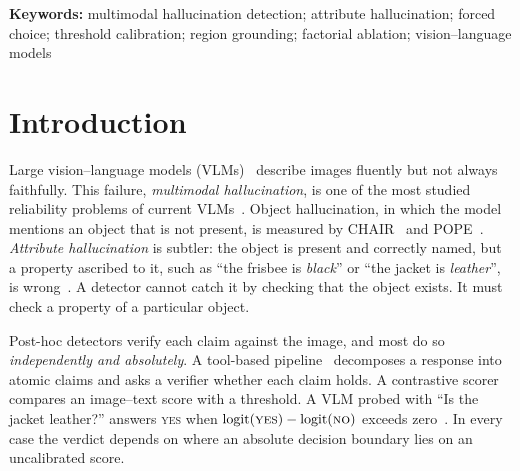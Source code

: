 \documentclass[11pt]{article}
\newcommand{\yes}{\textsc{yes}}
\newcommand{\no}{\textsc{no}}
\begin{document}
\noindent\textbf{Keywords:} multimodal hallucination detection; attribute hallucination; forced choice; threshold calibration; region grounding; factorial ablation; vision--language models

\section{Introduction}\label{sec:intro}

Large vision--language models (VLMs)~\cite{liu2023llava} describe images fluently but not always faithfully. This failure, \emph{multimodal hallucination}, is one of the most studied reliability problems of current VLMs~\cite{bai2024survey,chen2025survey}. Object hallucination, in which the model mentions an object that is not present, is measured by CHAIR~\cite{rohrbach2018chair} and POPE~\cite{li2023pope}. \emph{Attribute hallucination} is subtler: the object is present and correctly named, but a property ascribed to it, such as ``the frisbee is \emph{black}'' or ``the jacket is \emph{leather}'', is wrong~\cite{wang2023amber,zhang2026visor}. A detector cannot catch it by checking that the object exists. It must check a property of a particular object.

Post-hoc detectors verify each claim against the image, and most do so \emph{independently and absolutely}. A tool-based pipeline~\cite{yin2023woodpecker,jing2024faithscore,chen2024unihd,yang2026omnihallu} decomposes a response into atomic claims and asks a verifier whether each claim holds. A contrastive scorer~\cite{radford2021clip,zhai2023siglip,hessel2021clipscore} compares an image--text score with a threshold. A VLM probed with ``Is the jacket leather?'' answers \yes{} when $\mathrm{logit}(\yes)-\mathrm{logit}(\no)$ exceeds zero~\cite{zhang2026visor}. In every case the verdict depends on where an absolute decision boundary lies on an uncalibrated score.
\end{document}
